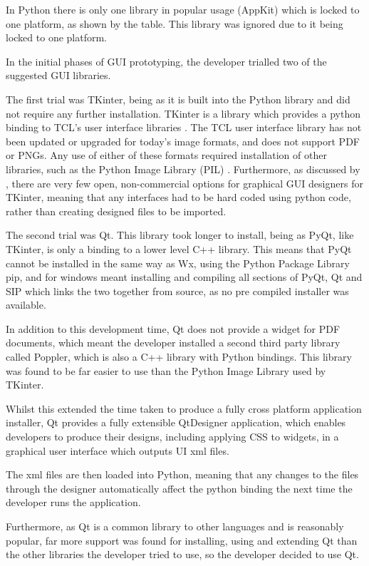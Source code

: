 In Python there is only one library in popular usage (AppKit) which is locked to one platform, as shown by the table. This library was ignored due to it being locked to one platform.

In the initial phases of GUI prototyping, the developer trialled two of the suggested GUI libraries.


The first trial was TKinter, being as it is built into the Python library and did not require any further installation. TKinter is a library which provides a python binding to TCL's user interface libraries \parencite{PythonTCL}.
 The TCL user interface library has not been updated or upgraded for today's image formats, and does not support PDF or PNGs. Any use of either of these formats required installation of other libraries, such as the Python Image Library (PIL) \parencite{PIL}.
 Furthermore, as discussed by \cite{GuiProgramming}, there are very few open, non-commercial options for graphical GUI designers for TKinter, meaning that any interfaces had to be hard coded using python code, rather than creating designed files to be imported.
 
 
 The second trial was Qt. This library took longer to install, being as PyQt, like TKinter, is only a binding to a lower level C++ library. This means that PyQt cannot be installed in the same way as Wx, using the Python Package Library pip, and for windows meant installing and compiling all sections of PyQt, Qt and SIP which links the two together from source, as no pre compiled installer was available.
 
 In addition to this development time, Qt does not provide a widget for PDF documents, which meant the developer installed a second third party library called Poppler, which is also a C++ library with Python bindings. This library was found to be far easier to use than the Python Image Library used by TKinter.
 
 Whilst this extended the time taken to produce a fully cross platform application installer, Qt provides a fully extensible QtDesigner application, which enables developers to produce their designs, including applying CSS to widgets, in a graphical user interface which outputs UI xml files. 
 
 The xml files are then loaded into Python, meaning that any changes to the files through the designer automatically affect the python binding the next time the developer runs the application.

Furthermore, as Qt is a common library to other languages and is reasonably popular, far more support was found for installing, using and extending Qt than the other libraries the developer tried to use, so the developer decided to use Qt.

